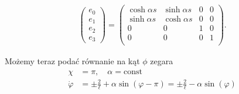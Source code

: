 \begin{align}\label{EHiper}
\begin{pmatrix}
e_0\\
e_1\\
e_2\\
e_3
\end{pmatrix}
=
\begin{pmatrix}
\cosh \alpha s & \sinh \alpha s & 0 &   0 \\
\sinh \alpha s & \cosh \alpha s & 0 &   0 \\
0 & 0 & 1 &   0 \\
0 & 0 & 0 &   1 \\
\end{pmatrix}.
\end{align}

Możemy teraz podać równanie na kąt $\phi$ zegara 
\begin{align}
\chi &= \pi, \quad \alpha = \text{const} \\
\dot{\varphi} &= \pm \frac{2}{\ell} + \alpha \sin ( \varphi - \pi )
 = \pm \frac{2}{\ell} -  \alpha \sin ( \varphi )
\end{align}
